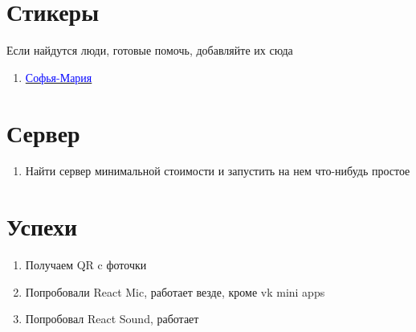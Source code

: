 \documentclass[11pt]{article}
\begin{document}
\section{Стикеры}

Если найдутся люди, готовые помочь,  добавляйте их сюда
\begin{enumerate}

\item \href{https://vk.com/sofiamarid_art}{\textcolor{blue}{Софья-Мария}}

\end{enumerate}
\section{Сервер}

\begin{enumerate}

\item Найти сервер минимальной стоимости и запустить на нем что-нибудь простое 

\end{enumerate}

\section*{Успехи}

\begin{enumerate}
\item Получаем QR c фоточки
\item Попробовали React Mic, работает везде, кроме vk mini apps
\item Попробовал React Sound, работает
\end{enumerate}
 
\end{document}
